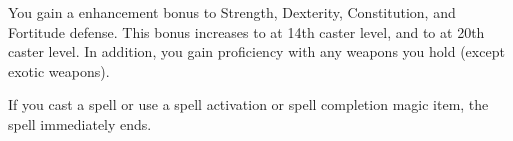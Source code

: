 \begin{spellheader}
    \spellrng{\rngpers}
    \spelldur{\durshort \dismissable}
\end{spellheader}
\begin{spelleffects}
    \spelleffect You gain a  enhancement bonus to Strength, Dexterity, Constitution, and Fortitude defense. This bonus increases to  at 14th caster level, and to  at 20th caster level. In addition, you gain proficiency with any weapons you hold (except exotic weapons).
\end{spelleffects}
\begin{spellfooter}
    \spellnotes If you cast a spell or use a spell activation or spell completion magic item, the spell immediately ends.
\end{spellfooter}

